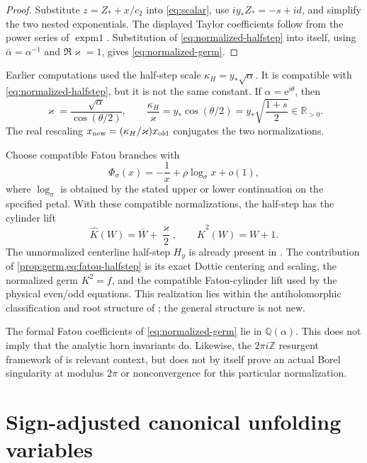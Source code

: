 \documentclass[11pt]{article}
\theoremstyle{definition}
\theoremstyle{remark}
\newcommand{\R}{\mathbb R}
\newcommand{\e}{\mathrm e}
\newcommand{\expmone}{\operatorname{expm1}}
\begin{document}
\begin{proof}
Substitute $z=Z_*+x/c_2$ into \cref{eq:scalar}, use $iy_*Z_*=-s+id$, and simplify the two nested exponentials.  The displayed Taylor coefficients follow from the power series of $\expmone$.  Substitution of \cref{eq:normalized-halfstep} into itself, using $\bar\alpha=\alpha^{-1}$ and $\Re\varkappa=1$, gives \cref{eq:normalized-germ}.
\end{proof}

Earlier computations used the half-step scale $\kappa_H=y_*\sqrt\alpha$.  It is compatible with \cref{eq:normalized-halfstep}, but it is not the same constant.  If $\alpha=\e^{i\theta}$, then
\[
  \varkappa=\frac{\sqrt\alpha}{\cos(\theta/2)},
  \qquad
  \frac{\kappa_H}{\varkappa}
  =y_*\cos(\theta/2)=y_*\sqrt{\frac{1+s}{2}}\in\R_{>0}.
\]
The real rescaling $x_{\rm new}=(\kappa_H/\varkappa)x_{\rm old}$ conjugates the two normalizations.

Choose compatible Fatou branches with
\begin{equation}
  \Phi_\sigma(x)=-\frac1x+\rho\log_\sigma x+o(1),
  \label{eq:fatou-asymptotic}
\end{equation}
where $\log_\sigma$ is obtained by the stated upper or lower continuation on the specified petal.  With these compatible normalizations, the half-step has the cylinder lift
\begin{equation}
  \widehat K(W)=\bar W+\frac{\varkappa}{2},
  \qquad \widehat K^2(W)=W+1.
  \label{eq:fatou-halfstep}
\end{equation}
The unnormalized centerline half-step $H_y$ is already present in \citet{BakerRippon1989Composite}.  The contribution of \cref{prop:germ,eq:fatou-halfstep} is its exact Dottie centering and scaling, the normalized germ $K^2=f$, and the compatible Fatou-cylinder lift used by the physical even/odd equations.  This realization lies within the antiholomorphic classification and root structure of \citet{GodinRousseau2022}; the general structure is not new.

The formal Fatou coefficients of \cref{eq:normalized-germ} lie in $\mathbb Q(\alpha)$.  This does not imply that the analytic horn invariants do.  Likewise, the $2\pi i\mathbb Z$ resurgent framework of \citet{DudkoSauzin2014,DudkoSauzin2015} is relevant context, but does not by itself prove an actual Borel singularity at modulus $2\pi$ or nonconvergence for this particular normalization.

\section{Sign-adjusted canonical unfolding variables}
\end{document}
